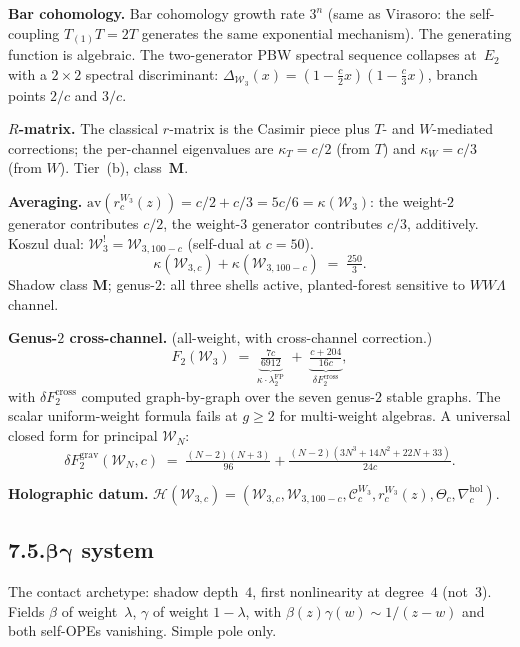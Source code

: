 \documentclass[11pt,reqno]{amsart}
\theoremstyle{definition}
\theoremstyle{remark}
\providecommand{\cC}{\mathcal{C}}
\providecommand{\cH}{\mathcal{H}}
\providecommand{\cW}{\mathcal{W}}
\providecommand{\hol}{\mathrm{hol}}
\providecommand{\FP}{\mathrm{FP}}
\providecommand{\FP}{\mathrm{FP}}
\numberwithin{equation}{section}
\begin{document}
\medskip\noindent\textbf{Bar cohomology.}\enspace
Bar cohomology growth rate $3^n$ (same as Virasoro: the
self-coupling $T_{(1)}T=2T$ generates the same exponential
mechanism). The generating function is algebraic. The
two-generator PBW spectral sequence collapses at~$E_2$
with a $2\times 2$ spectral discriminant:
$\Delta_{\cW_3}(x)=(1-\tfrac{c}{2}x)(1-\tfrac{c}{3}x)$,
branch points $2/c$ and $3/c$.

\medskip\noindent\textbf{$R$-matrix.}\enspace
The classical $r$-matrix is the Casimir piece plus $T$- and
$W$-mediated corrections; the per-channel eigenvalues are
$\kappa_T=c/2$ (from $T$) and $\kappa_W=c/3$ (from $W$).
Tier~(b), class~$\mathbf{M}$.

\medskip\noindent\textbf{Averaging.}\enspace
$\mathrm{av}(r_c^{W_3}(z))=c/2+c/3=5c/6=\kappa(\cW_3)$:
the weight-$2$ generator contributes $c/2$, the weight-$3$
generator contributes $c/3$, additively.
Koszul dual: $\cW_3^!=\cW_{3,100-c}$ (self-dual at $c=50$).
\[
\kappa(\cW_{3,c})+\kappa(\cW_{3,100-c})\;=\;\tfrac{250}{3}.
\]
Shadow class $\mathbf M$; genus-$2$: all three shells active,
planted-forest sensitive to $WW\Lambda$ channel.

\medskip\noindent\textbf{Genus-$2$ cross-channel.}\enspace
(all-weight, with cross-channel correction.)
\begin{equation}\label{eq:w3-genus2-b}
F_2(\cW_3)
\;=\;
\underbrace{\tfrac{7c}{6912}}_{\kappa\cdot\lambda_2^{\FP}}
\;+\;
\underbrace{\tfrac{c+204}{16c}}_{\delta F_2^{\mathrm{cross}}},
\end{equation}
with $\delta F_2^{\mathrm{cross}}$ computed graph-by-graph over
the seven genus-$2$ stable graphs. The scalar uniform-weight
formula fails at $g\ge 2$ for multi-weight algebras.
A universal closed form for principal $\cW_N$:
\[
\delta F_2^{\mathrm{grav}}(\cW_N,c)
\;=\;
\tfrac{(N-2)(N+3)}{96}
+\tfrac{(N-2)(3N^3+14N^2+22N+33)}{24c}.
\]

\medskip\noindent\textbf{Holographic datum.}
$\cH(\cW_{3,c})=(\cW_{3,c},\cW_{3,100-c},\cC_c^{W_3},
r_c^{W_3}(z),\Theta_c,\nabla^{\hol}_c)$.

\subsection*{7.5.\quad $\boldsymbol{\beta\gamma}$ system}

The contact archetype: shadow depth~$4$, first nonlinearity at
degree~$4$ (not~$3$). Fields $\beta$ of weight~$\lambda$,
$\gamma$ of weight $1-\lambda$, with
$\beta(z)\gamma(w)\sim 1/(z-w)$ and both self-OPEs vanishing.
Simple pole only.
\end{document}
